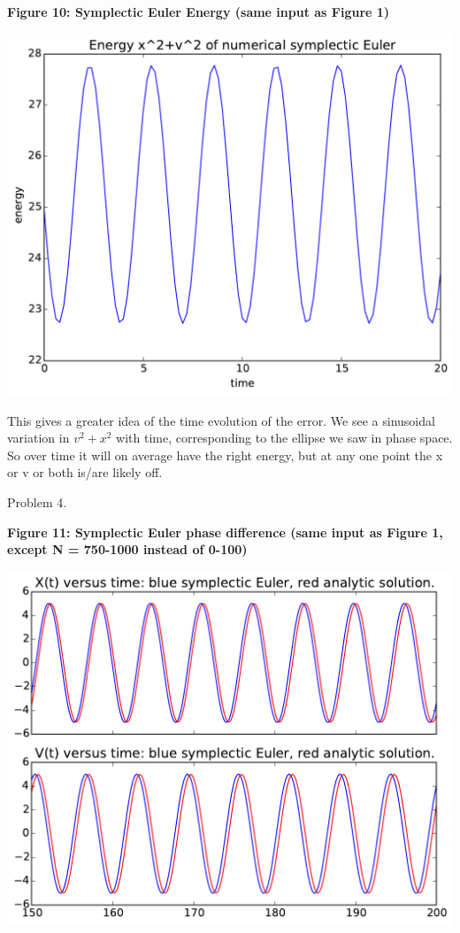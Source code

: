 \documentclass{article}
\begin{document}
\begin{minipage}{1.0\textwidth}
\begin{center}
    \textbf{Figure 10: Symplectic Euler Energy (same input as Figure 1)}\par\medskip
    \includegraphics[scale=1.0]{symp_energy}
\end{center}
\end{minipage}

This gives a greater idea of the time evolution of the error. We see a sinusoidal variation in $v^2 + x^2$ with time, corresponding to the ellipse we saw in phase space. So over time it will on average have the right energy, but at any one point the x or v or both is/are likely off.

\bigskip

Problem 4.

\bigskip

\begin{minipage}{1.0\textwidth}
\begin{center}
    \textbf{Figure 11: Symplectic Euler phase difference (same input as Figure 1, except N = 750-1000 instead of 0-100)}\par\medskip
    \includegraphics[scale=1.0]{symp_lag}
\end{center}
\end{minipage}
\end{document}
